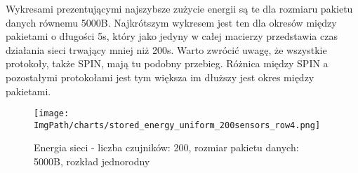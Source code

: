 Wykresami prezentującymi najszybsze zużycie energii są te dla rozmiaru pakietu danych równemu 5000B. Najkrótszym wykresem jest ten dla okresów między pakietami o długości 5s, który jako jedyny w całej macierzy przedstawia czas działania sieci trwający mniej niż 200s. Warto zwrócić uwagę, że wszystkie protokoły, także SPIN, mają tu podobny przebieg. Różnica między SPIN a pozostałymi protokołami jest tym większa im dłuższy jest okres między pakietami.


\begin{figure}[H]
	\begin{center}
		\texttt{[image: \\ImgPath/charts/stored\_energy\_uniform\_200sensors\_row4.png]}
	\end{center}
	\caption{Energia sieci - liczba czujników: 200, rozmiar pakietu danych: 5000B, rozkład jednorodny}
\end{figure}
